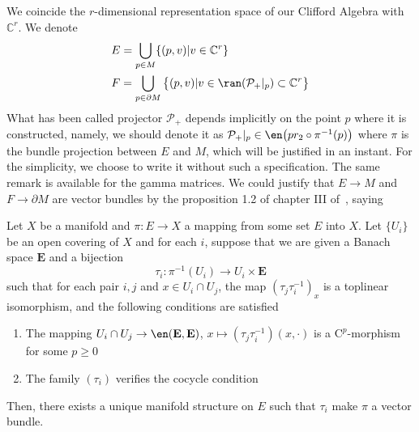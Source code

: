 We coincide the $r$-dimensional representation space of our Clifford Algebra with $\mathbb{C}^r$.
We denote 
\begin{equation*}
\begin{split}
&E = \bigcup_{p\in M}\{(p, v) \vert v \in\mathbb{C}^r\}  \\
&F=\bigcup_{p\in \partial M}\big\{(p, v) \vert v \in \ran({\mathcal P}_+\vert_p) \subset \mathbb{C}^{r } \big\}
\end{split}
\end{equation*}
What has been called projector $\mathcal P _+$ depends implicitly on the point $p$ where it is constructed, namely, we should denote it as $\mathcal P_+\vert_p \in \en \big(pr_2 \circ \pi^{-1}(p)\big)$ where $\pi$ is the bundle projection between $E$ and $M$, which will be justified in an instant.
For the simplicity, we choose to write it without such a specification.
The same remark is available for the gamma matrices.
We could justify that $E \rightarrow M$ and $F \rightarrow \partial M$ are vector bundles by the proposition 1.2 of chapter III of~\cite{Lang1999}, saying
\begin{proposition}\label{wen-proplang}
Let $X$ be a manifold and $\pi: E\rightarrow X$ a mapping from some set $E$ into $X$. Let $\{ U_i\}$ be an open covering of $X$ and for each $i$, suppose that we are given a Banach space $\mathbf{E}$ and a bijection
\begin{equation*}
\tau_i : \pi^{-1}(U_i) \rightarrow U_i\times \mathbf{E}
\end{equation*}
such that for each pair $i, j $ and $x\in U_i \cap U_j$, the map $(\tau_j\tau_i^{-1})_x$ is a toplinear isomorphism, and the following conditions are satisfied
\begin{enumerate}
\item The mapping $U_i \cap U_j \rightarrow \en(\mathbf{E}, \mathbf{E})$, $x \mapsto(\tau_j\tau_i^{-1})(x, \cdot)$ is a $\mathrm{C}^p$-morphism for some $p\geq 0$
\item The family $(\tau_i)$ verifies the cocycle condition
\end{enumerate}
Then, there exists a unique manifold structure on $E$ such that $\tau_i$ make $\pi$ a vector bundle.
\end{proposition}
